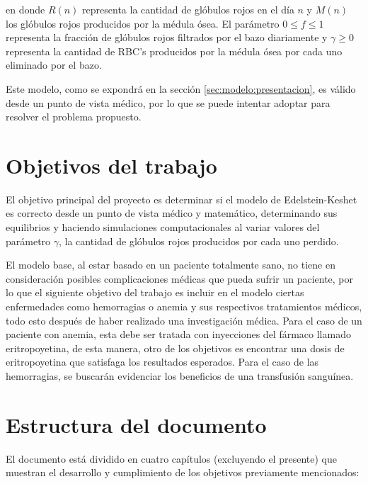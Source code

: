 en donde $R(n)$ representa la cantidad de glóbulos rojos en el día $n$ y $M(n)$ los glóbulos rojos producidos por la médula ósea. El parámetro $0\leq f \leq 1$ representa la fracción de glóbulos rojos filtrados por el bazo diariamente y $\gamma \geq 0$ representa la cantidad de RBC's producidos por la médula ósea por cada uno eliminado por el bazo. 

Este modelo, como se expondrá en la sección \ref{sec:modelo:presentacion}, es válido desde un punto de vista médico, por lo que se puede intentar adoptar para resolver el problema propuesto. 

\section{Objetivos del trabajo}

El objetivo principal del proyecto es determinar si el modelo de Edelstein-Keshet es correcto desde un punto de vista médico y matemático, determinando sus equilibrios y haciendo simulaciones computacionales al variar valores del parámetro $\gamma$, la cantidad de glóbulos rojos producidos por cada uno perdido.

El modelo base, al estar basado en un paciente totalmente sano, no tiene en consideración posibles complicaciones médicas que pueda sufrir un paciente, por lo que el siguiente objetivo del trabajo es incluir en el modelo ciertas enfermedades como hemorragias o anemia y sus respectivos tratamientos médicos, todo esto después de haber realizado una investigación médica. Para el caso de un paciente con anemia, esta debe ser tratada con inyecciones del fármaco llamado eritropoyetina, de esta manera, otro de los objetivos es encontrar una dosis de eritropoyetina que satisfaga los resultados esperados. Para el caso de las hemorragias, se buscarán evidenciar los beneficios de una transfusión sanguínea.

\section{Estructura del documento}

El documento está dividido en cuatro capítulos (excluyendo el presente) que muestran el desarrollo y cumplimiento de los objetivos previamente mencionados:

